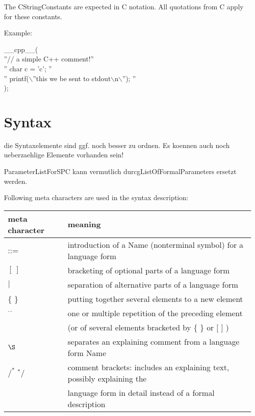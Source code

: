 The CStringConstants are expected in C notation.
All quotations from C apply for these constants.

Example:

\_\_cpp\_\_(	\\
\x ''// a simple C++ comment!''	\\
\x '' char c = 'c';    ''\\
\x '' printf($\backslash$''this we be sent to stdout$\backslash$n$\backslash$'');  '' \\
);


\newpage
\section{Syntax}    %
\begin{discuss}
die Syntaxelemente sind ggf. noch besser zu ordnen.
Es koennen auch noch ueberzaehlige Elemente vorhanden sein!

ParameterListForSPC kann vermutlich durcgListOfFormalParameters ersetzt 
werden.


\end{discuss}

Following meta characters are used in the syntax description:\\ 

\begin{tabular}{ll}
meta character & meaning \\ \hline
::=            & introduction of a Name (nonterminal symbol) for a language form\\
$[\ ]$         & bracketing of optional parts of a language form \\ 
$\mid$         & separation of alternative parts of a language form\\
\{ \}          & putting together several elements to a new element\\
$^{...}$       & one or multiple repetition of the preceding element\\
               & (or of several elements bracketed by \{ \} or [ ] ) \\
$\S $          & separates an explaining comment from a language form Name\\
$/^*$ $^*/$    & comment brackets: 
                 includes an explaining text, possibly explaining the\\
               & language form in detail instead of a formal description\\
\end{tabular}

